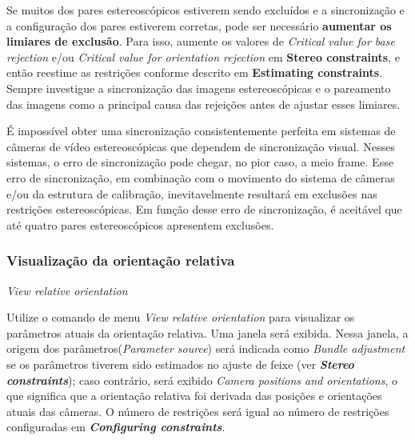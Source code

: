 \documentclass[
  12pt,
  letterpaper,
  DIV=11,
  numbers=noendperiod]{scrreprt}
\begin{document}
Se muitos dos pares estereoscópicos estiverem sendo excluídos e a
sincronização e a configuração dos pares estiverem corretas, pode ser
necessário \textbf{aumentar os limiares de exclusão}. Para isso, aumente
os valores de \emph{Critical value for base rejection} e/ou
\emph{Critical value for orientation rejection} em \textbf{Stereo
constraints}, e então reestime as restrições conforme descrito em
\textbf{Estimating constraints}. Sempre investigue a sincronização das
imagens estereoscópicas e o pareamento das imagens como a principal
causa das rejeições antes de ajustar esses limiares.

\begin{tcolorbox}[enhanced jigsaw, colframe=quarto-callout-note-color-frame, toprule=.15mm, opacitybacktitle=0.6, opacityback=0, bottomtitle=1mm, colback=white, coltitle=black, left=2mm, toptitle=1mm, titlerule=0mm, leftrule=.75mm, title=\textcolor{quarto-callout-note-color}{\faInfo}\hspace{0.5em}{Note}, rightrule=.15mm, arc=.35mm, breakable, bottomrule=.15mm, colbacktitle=quarto-callout-note-color!10!white]

É impossível obter uma sincronização consistentemente perfeita em
sistemas de câmeras de vídeo estereoscópicas que dependem de
sincronização visual. Nesses sistemas, o erro de sincronização pode
chegar, no pior caso, a meio frame. Esse erro de sincronização, em
combinação com o movimento do sistema de câmeras e/ou da estrutura de
calibração, inevitavelmente resultará em exclusões nas restrições
estereoscópicas. Em função desse erro de sincronização, é aceitável que
até quatro pares estereoscópicos apresentem exclusões.

\end{tcolorbox}

\subsubsection{\texorpdfstring{\textbf{Visualização da orientação
relativa}}{Visualização da orientação relativa}}\label{visualizauxe7uxe3o-da-orientauxe7uxe3o-relativa}

\emph{View relative orientation}

Utilize o comando de menu \emph{View relative orientation} para
visualizar os parâmetros atuais da orientação relativa. Uma janela será
exibida. Nessa janela, a origem dos parâmetros(\emph{Parameter source})
será indicada como \emph{Bundle adjustment} se os parâmetros tiverem
sido estimados no ajuste de feixe (ver \textbf{\emph{Stereo
constraints}}); caso contrário, será exibido \emph{Camera positions and
orientations}, o que significa que a orientação relativa foi derivada
das posições e orientações atuais das câmeras. O número de restrições
será igual ao número de restrições configuradas em
\textbf{\emph{Configuring constraints}}.
\end{document}
